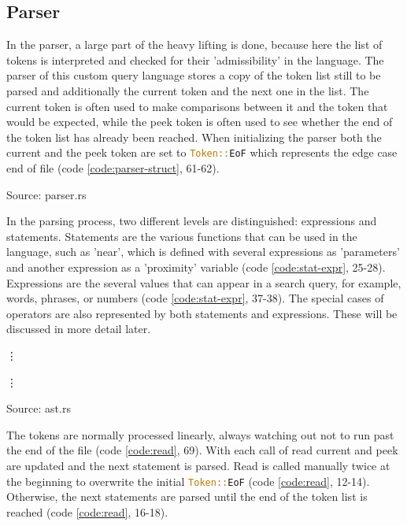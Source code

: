 \subsection{Parser}
In the parser, a large part of the heavy lifting is done, because here the list of tokens is interpreted and checked for their 'admissibility' in the language. The parser of this custom query language stores a copy of the token list still to be parsed and additionally the current token and the next one in the list. The current token is often used to make comparisons between it and the token that would be expected, while the peek token is often used to see whether the end of the token list has already been reached. When initializing the parser both the current and the peek token are set to \lstinline[language=Rust]$Token::EoF$ which represents the edge case end of file (code \ref{code:parser-struct}, 61-62).
\begin{codeenv}
    \label{code:parser-struct}
    
    \centerline{Source: parser.rs}
\end{codeenv}
In the parsing process, two different levels are distinguished: expressions and statements. Statements are the various functions that can be used in the language, such as 'near', which is defined with several expressions as 'parameters' and another expression as a 'proximity' variable (code \ref{code:stat-expr}, 25-28). Expressions are the several values that can appear in a search query, for example, words, phrases, or numbers (code \ref{code:stat-expr}, 37-38). The special cases of operators are also represented by both statements and expressions. These will be discussed in more detail later.
\begin{codeenv}
    \label{code:stat-expr}
    
    \vdots
    
    \vdots
    
    \centerline{Source: ast.rs}
\end{codeenv}
The tokens are normally processed linearly, always watching out not to run past the end of the file (code \ref{code:read}, 69). With each call of read current and peek are updated and the next statement is parsed. Read is called manually twice at the beginning to overwrite the initial \lstinline[language=Rust]$Token::EoF$ (code \ref{code:read}, 12-14). Otherwise, the next statements are parsed until the end of the token list is reached (code \ref{code:read}, 16-18).
